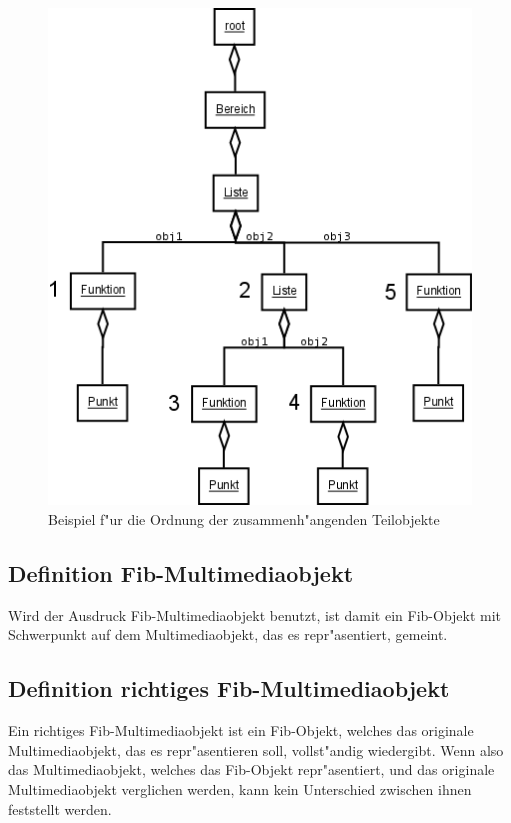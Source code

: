 \begin{figure}[htbp]
\begin{center}
  \includegraphics[scale=0.5]{order_partobjects}
\end{center}
\caption{Beispiel f"ur die Ordnung der zusammenh"angenden Teilobjekte}
\label{figOrderPartobjekts}
\end{figure}



\subsection{Definition Fib-Multimediaobjekt}

Wird der Ausdruck Fib-Multimediaobjekt benutzt, ist damit ein Fib-Objekt mit Schwerpunkt auf dem Multimediaobjekt, das es repr"asentiert, gemeint.


\subsection{Definition richtiges Fib-Multimediaobjekt}

Ein richtiges Fib-Multimediaobjekt ist ein Fib-Objekt, welches das originale Multimediaobjekt, das es repr"asentieren soll, vollst"andig wiedergibt. Wenn also das Multimediaobjekt, welches das Fib-Objekt repr"asentiert, und das originale Multimediaobjekt verglichen werden, kann kein Unterschied zwischen ihnen feststellt werden.






